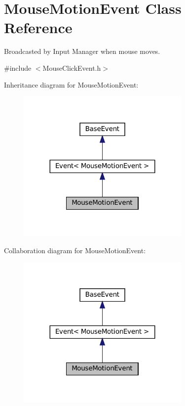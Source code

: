 \hypertarget{classMouseMotionEvent}{}\section{Mouse\+Motion\+Event Class Reference}
\label{classMouseMotionEvent}


Broadcasted by Input Manager when mouse moves.  




{\ttfamily \#include $<$Mouse\+Click\+Event.\+h$>$}



Inheritance diagram for Mouse\+Motion\+Event\+:
\nopagebreak
\begin{figure}[H]
\begin{center}
\leavevmode
\includegraphics[width=239pt]{classMouseMotionEvent__inherit__graph}
\end{center}
\end{figure}


Collaboration diagram for Mouse\+Motion\+Event\+:
\nopagebreak
\begin{figure}[H]
\begin{center}
\leavevmode
\includegraphics[width=239pt]{classMouseMotionEvent__coll__graph}
\end{center}
\end{figure}
